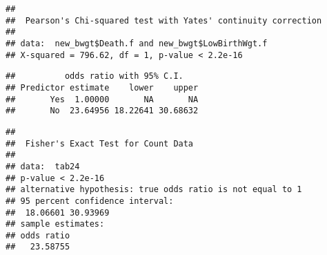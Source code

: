 \documentclass[
]{article}
\newenvironment{Shaded}{\begin{snugshade}}{\end{snugshade}}
\newcommand{\AttributeTok}[1]{\textcolor[rgb]{0.77,0.63,0.00}{#1}}
\newcommand{\CommentTok}[1]{\textcolor[rgb]{0.56,0.35,0.01}{\textit{#1}}}
\newcommand{\FunctionTok}[1]{\textcolor[rgb]{0.00,0.00,0.00}{#1}}
\newcommand{\NormalTok}[1]{#1}
\newcommand{\OtherTok}[1]{\textcolor[rgb]{0.56,0.35,0.01}{#1}}
\newcommand{\SpecialCharTok}[1]{\textcolor[rgb]{0.00,0.00,0.00}{#1}}
\newcommand{\StringTok}[1]{\textcolor[rgb]{0.31,0.60,0.02}{#1}}
\begin{document}
\begin{Shaded}
\end{Shaded}

\begin{verbatim}
## 
##  Pearson's Chi-squared test with Yates' continuity correction
## 
## data:  new_bwgt$Death.f and new_bwgt$LowBirthWgt.f
## X-squared = 796.62, df = 1, p-value < 2.2e-16
\end{verbatim}

\begin{Shaded}
\end{Shaded}

\begin{verbatim}
##          odds ratio with 95% C.I.
## Predictor estimate    lower    upper
##       Yes  1.00000       NA       NA
##       No  23.64956 18.22641 30.68632
\end{verbatim}

\begin{Shaded}
\end{Shaded}

\begin{verbatim}
## 
##  Fisher's Exact Test for Count Data
## 
## data:  tab24
## p-value < 2.2e-16
## alternative hypothesis: true odds ratio is not equal to 1
## 95 percent confidence interval:
##  18.06601 30.93969
## sample estimates:
## odds ratio 
##   23.58755
\end{verbatim}
\end{document}
